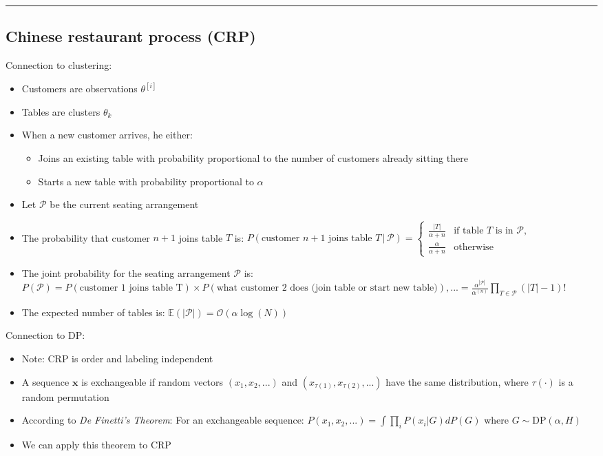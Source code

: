 {\color{black}\hrule height 0.001mm}

\subsection*{Chinese restaurant process (CRP)}
Connection to clustering:
\begin{itemize}
    \item Customers are observations $\theta^{[i]}$
    \item Tables are clusters $\theta_k$
    \item When a new customer arrives, he either:
    \begin{itemize}
        \item Joins an existing table with probability proportional to the number of customers already sitting there
        \item Starts a new table with probability proportional to $\alpha$
    \end{itemize}
    \item Let $\mathcal{P}$ be the current seating arrangement
    \item The probability that customer $n+1$ joins table $T$ is:
    $P(\textrm{customer } n+1 \textrm{ joins table } T \, | \, \mathcal{P}) = 
    \begin{cases} 
    \frac{|T|}{\alpha + n} & \textrm{if table } T \textrm{ is in } \mathcal{P}, \\
    \frac{\alpha}{\alpha + n} & \textrm{otherwise}
    \end{cases}$
    \item The joint probability for the seating arrangement $\mathcal{P}$ is:
    $P(\mathcal{P}) = P(\textrm{customer 1 joins table T}) \times P(\textrm{what customer 2 does (join table or start new table)}), ... = \frac{\alpha^{|\mathcal{P}|}}{\alpha^{(n)}} \prod_{T \in \mathcal{P}} (|T| - 1)!$
    \item The expected number of tables is:
    $\mathbb{E}(|\mathcal{P}|) = \mathcal{O}(\alpha \log(N))$
\end{itemize}
Connection to DP:
\begin{itemize}
    \item Note: CRP is order and labeling independent
    \item A sequence $\boldsymbol{x}$ is exchangeable if random vectors $(x_1, x_2, ...)$ and $(x_{\tau(1)}, x_{\tau(2)}, ...)$ have the same distribution, where $\tau(\cdot)$ is a random permutation
    \item According to \emph{De Finetti's Theorem}: For an exchangeable sequence:
    $P(x_1, x_2, ...) = \int \prod_i P(x_i | G) dP(G)$
    where $G \sim \textrm{DP}(\alpha, H)$
    \item We can apply this theorem to CRP
\end{itemize}
